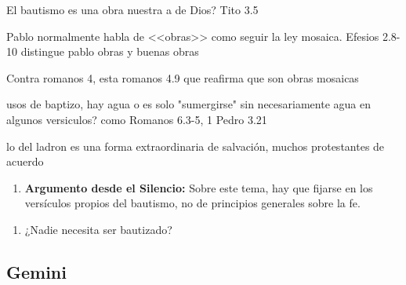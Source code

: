 \documentclass[12pt]{report}
\begin{document}
	El bautismo es una obra nuestra a de Dios? Tito 3.5
	
	Pablo normalmente habla de <<obras>> como seguir la ley mosaica. Efesios 2.8-10 distingue pablo obras y buenas obras
	
	Contra romanos 4, esta romanos 4.9 que reafirma que son obras mosaicas
	
	usos de baptizo, hay agua o es solo "sumergirse" sin necesariamente agua en algunos versiculos? como Romanos 6.3-5, 1 Pedro 3.21
	
	lo del ladron es una forma extraordinaria de salvación, muchos protestantes de acuerdo
	
	
	\begin{bloque}[Respuesta]
		\begin{enumerate}
			\item \textbf{Argumento desde el Silencio:} Sobre este tema, hay que fijarse en los versículos propios del bautismo, no de principios generales sobre la fe.
		\end{enumerate}
	\end{bloque}
	
	
	\begin{minibloque}[Problemas]
		\begin{enumerate}
			\item ¿Nadie necesita ser bautizado?
		\end{enumerate}
	\end{minibloque}		
	
	
	\subsection{Gemini}
	
\end{document}
